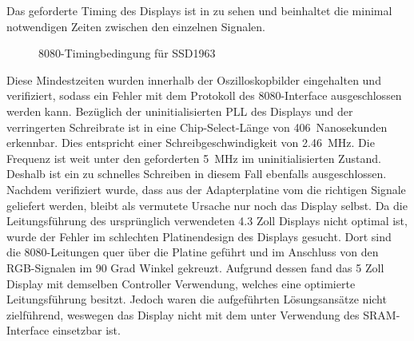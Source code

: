 \newpage
Das geforderte Timing des Displays ist in  zu sehen und beinhaltet die minimal notwendigen Zeiten zwischen den einzelnen Signalen.
\begin{figure}[htp]
	\centering
{}
	\caption{8080-Timingbedingung für SSD1963}
	\label{fig:ssd1963_timing_constraints}
\end{figure}\newline
Diese Mindestzeiten wurden innerhalb der Oszilloskopbilder eingehalten und verifiziert, sodass ein Fehler mit dem Protokoll des 8080-Interface ausgeschlossen werden kann. Bezüglich der uninitialisierten PLL des Displays und der verringerten Schreibrate ist in  eine Chip-Select-Länge von 406~Nanosekunden erkennbar. Dies entspricht einer Schreibgeschwindigkeit von 2.46~MHz. Die Frequenz ist weit unter den geforderten 5~MHz im uninitialisierten Zustand. Deshalb ist ein zu schnelles Schreiben in diesem Fall ebenfalls ausgeschlossen. Nachdem verifiziert wurde, dass aus der Adapterplatine vom  die richtigen Signale geliefert werden, bleibt als vermutete Ursache nur noch das Display selbst. Da die Leitungsführung des ursprünglich verwendeten 4.3 Zoll Displays nicht optimal ist, wurde der Fehler im schlechten Platinendesign des Displays gesucht.
Dort sind die 8080-Leitungen quer über die Platine geführt und im Anschluss von den RGB-Signalen im 90 Grad Winkel gekreuzt. Aufgrund dessen fand das 5 Zoll Display mit demselben Controller Verwendung, welches eine optimierte Leitungsführung besitzt. Jedoch waren die aufgeführten Lösungsansätze nicht zielführend, weswegen das Display nicht mit dem  unter Verwendung des SRAM-Interface einsetzbar ist.